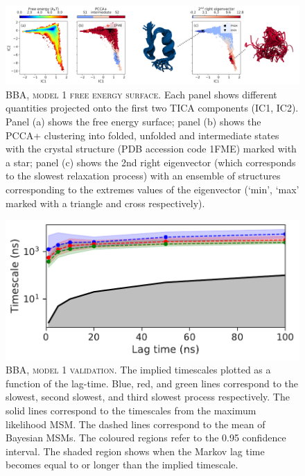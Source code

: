 \documentclass{article}
\begin{document}
\begin{figure}[h]
    \centering
    \includegraphics[width=\columnwidth]{SI_figures/BBA_24_SI-2.png}
    \caption{\textsc{BBA,  model 1 free energy surface}. Each panel shows different quantities projected onto the first two TICA components (IC1, IC2).  Panel (a) shows the free energy surface; panel (b) shows the PCCA+ clustering into folded, unfolded and intermediate states with the crystal structure (PDB accession code 1FME) marked with a star; panel (c) shows the 2nd right eigenvector (which corresponds to the slowest relaxation process) with an ensemble of structures corresponding to the extremes values of the eigenvector (`min', `max' marked with a triangle and cross respectively). }
    \label{si_fig:BBA_24_2}
\end{figure}

\begin{figure}[h]
    \centering
    \includegraphics[height=0.15\textheight]{SI_figures/BBA_24_its.pdf}
    \caption{\textsc{BBA, model 1 validation}. The implied timescales plotted as a function of the lag-time. Blue, red, and green lines correspond to the slowest, second slowest, and third slowest process respectively. The solid lines correspond to the timescales from the maximum likelihood MSM. The dashed lines correspond to the mean of Bayesian MSMs. The coloured regions refer to the 0.95 confidence interval. The shaded region shows when the Markov lag time becomes equal to or longer than the implied timescale.}
    \label{si_fig:BBA_24_3}
\end{figure}
\end{document}

